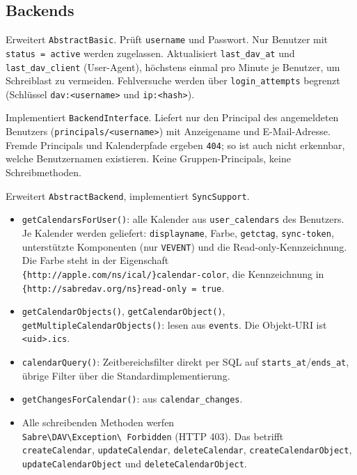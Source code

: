 \documentclass[a4paper,fontsize=10pt]{scrartcl}
\newcommand{\code}[1]{\texttt{#1}}
\begin{document}
\subsection{Backends}

\begin{description}[style=nextline, leftmargin=1.2cm]
  \item[\code{FfAuthBackend}]
    Erweitert \code{AbstractBasic}.
    Prüft \code{username} und Passwort. Nur Benutzer mit
    \code{status = active} werden zugelassen. Aktualisiert
    \code{last\_dav\_at} und \code{last\_dav\_client} (User-Agent),
    höchstens einmal pro Minute je Benutzer, um Schreiblast zu vermeiden.
    Fehlversuche werden über \code{login\_attempts} begrenzt
    (Schlüssel \code{dav:<username>} und \code{ip:<hash>}).
  \item[\code{FfPrincipalBackend}]
    Implementiert \code{BackendInterface}.
    Liefert nur den Principal des angemeldeten Benutzers
    (\code{principals/<username>}) mit Anzeigename und E-Mail-Adresse.
    Fremde Principals und Kalenderpfade ergeben \code{404}; so ist auch
    nicht erkennbar, welche Benutzernamen existieren. Keine
    Gruppen-Principals, keine Schreibmethoden.
  \item[\code{FfCalendarBackend}]
    Erweitert \code{AbstractBackend}, implementiert \code{SyncSupport}.
    \begin{itemize}
      \item \code{getCalendarsForUser()}: alle Kalender aus
            \code{user\_calendars} des Benutzers. Je Kalender werden
            geliefert: \code{displayname}, Farbe, \code{getctag},
            \code{sync-token}, unterstützte Komponenten (nur
            \code{VEVENT}) und die Read-only-Kennzeichnung. Die Farbe
            steht in der Eigenschaft\\
            \code{\{http://apple.com/ns/ical/\}calendar-color}, die
            Kennzeichnung in\\
            \code{\{http://sabredav.org/ns\}read-only = true}.
      \item \code{getCalendarObjects()}, \code{getCalendarObject()},
            \code{getMultipleCalendarObjects()}: lesen aus \code{events}.
            Die Objekt-URI ist \code{<uid>.ics}.
      \item \code{calendarQuery()}: Zeitbereichsfilter direkt per SQL auf
            \code{starts\_at}/\code{ends\_at}, übrige Filter über die
            Standardimplementierung.
      \item \code{getChangesForCalendar()}: aus \code{calendar\_changes}.
      \item Alle schreibenden Methoden werfen\\
            \code{Sabre\textbackslash DAV\textbackslash Exception\textbackslash
            Forbidden} (HTTP 403). Das betrifft
            \code{createCalendar}, \code{updateCalendar},
            \code{deleteCalendar}, \code{createCalendarObject},
            \code{updateCalendarObject} und \code{deleteCalendarObject}.
    \end{itemize}
\end{description}
\end{document}
